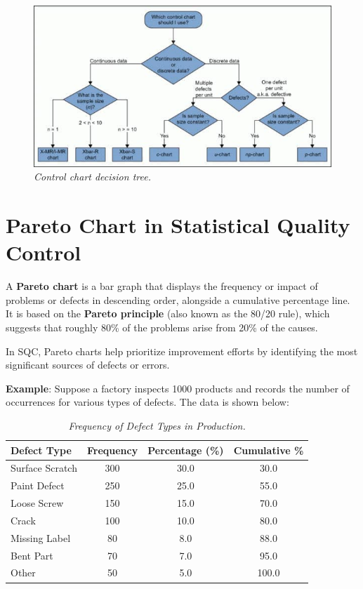 \documentclass[twoside]{book}
\begin{document}
\begin{figure}
\centering
\includegraphics[scale=0.6]{pic/control-chart-decision-tree.jpg}
\caption{\textit{Control chart decision tree.}}
\end{figure}

\section{Pareto Chart in Statistical Quality Control}

A \textbf{Pareto chart} is a bar graph that displays the frequency or impact of problems or defects in descending order, alongside a cumulative percentage line. It is based on the \textbf{Pareto principle} (also known as the 80/20 rule), which suggests that roughly 80\% of the problems arise from 20\% of the causes.

In SQC, Pareto charts help prioritize improvement efforts by identifying the most significant sources of defects or errors.

\textbf{Example}: Suppose a factory inspects 1000 products and records the number of occurrences for various types of defects. The data is shown below:

\begin{table}[H]
\centering
\begin{tabular}{l|c|c|c}
\toprule
\textbf{Defect Type} & \textbf{Frequency} & \textbf{Percentage (\%)} & \textbf{Cumulative \%} \\
\midrule
Surface Scratch & 300 & 30.0 & 30.0 \\
Paint Defect & 250 & 25.0 & 55.0 \\
Loose Screw & 150 & 15.0 & 70.0 \\
Crack & 100 & 10.0 & 80.0 \\
Missing Label & 80 & 8.0 & 88.0 \\
Bent Part & 70 & 7.0 & 95.0 \\
Other & 50 & 5.0 & 100.0 \\
\bottomrule
\end{tabular}
\caption{\textit{Frequency of Defect Types in Production.}}
\end{table}
\end{document}

